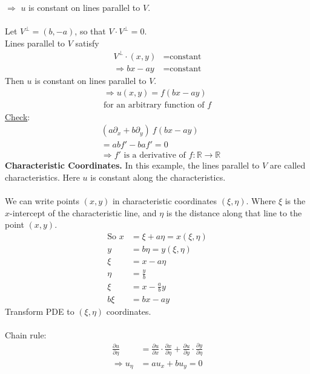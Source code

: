 \documentclass[12pt, letterpaper]{article}
\begin{document}
$\Rightarrow$ $u$ is constant on lines parallel to $V$. \\ \\
Let $V^\perp = (b,-a)$, so that $V \cdot V^\perp = 0$. \\
Lines parallel to $V$ satisfy 
\begin{align*}
    V^\perp \cdot (x,y) &= \text{constant} \\
    \Rightarrow bx - ay &= \text{constant}
\end{align*}
Then $u$ is constant on lines parallel to $V$.
\begin{align*}
    \Rightarrow u(x,y) = f(bx-ay) \\
    \text{for an arbitrary function of }f
\end{align*}
\underline{Check}:
\begin{align*}
    &(a\partial_x + b\partial_y)\ f(bx - ay) \\
    &= abf' - baf' = 0 \\
    &\Rightarrow f' \text{ is a derivative of } f:\mathbb{R} \rightarrow \mathbb{R}
\end{align*}
\textbf{Characteristic Coordinates.} In this example, the lines parallel to $V$ are 
called characteristics. Here $u$ is constant along the characteristics. \\ \\
We can write points $(x,y)$ in characteristic coordinates $(\xi, \eta)$. Where  
$\xi$ is the $x$-intercept of the characteristic line, and $\eta$ is 
the distance along that line to the point $(x,y)$. 
\begin{align*}
    \text{So } x &= \xi + a\eta = x(\xi,\eta) \\
    y &= b\eta = y(\xi,\eta) \\
    \xi &= x - a\eta \\
    \eta &= \frac{y}{b} \\
    \xi &= x - \frac{a}{b}y \\
    b\xi &= bx - ay
\end{align*}
Transform PDE to $(\xi, \eta)$ coordinates. \\ \\
Chain rule:
\begin{align*}
    \frac{\partial u}{\partial\eta} &= \frac{\partial u}{\partial x} \cdot 
    \frac{\partial x}{\partial \eta} + \frac{\partial u}{\partial y} \cdot 
    \frac{\partial y }{\partial \eta} \\
    \Rightarrow u_\eta &= au_x + bu_y = 0
\end{align*}
\end{document}
